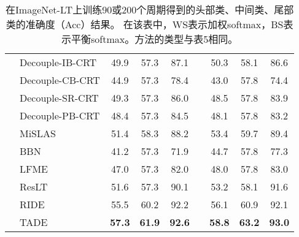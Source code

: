 \begin{table*}[!t]
\begin{minipage}[t]{0.48\textwidth}
{\begin{tabular}{llccccccc}
\cmidrule{2-9}          & Decouple-IB-CRT \cite{kang2019decoupling}  & 49.9  & 57.3  & 87.1  &       & 50.3  & 58.1  & 86.6  \\
& Decouple-CB-CRT \cite{kang2019decoupling} & 44.9  & 57.3  & 78.4  &       & 43.0  & 57.8  & 74.4  \\
& Decouple-SR-CRT \cite{kang2019decoupling}  & 49.3  & 57.3  & 86.0  &       & 48.5  & 57.8  & 83.9  \\
& Decouple-PB-CRT \cite{kang2019decoupling}  & 48.4  & 57.3  & 84.5  &       & 48.1  & 57.8  & 83.2  \\
& MiSLAS \cite{Zhong_2021}  & 51.4  & 58.3  & 88.2  &       & 53.4  & 59.7  & 89.4  \\
\cmidrule{2-9}          & BBN \cite{Zhou_2020}  & 41.2  & 57.3  & 71.9  &       & 44.7  & 57.8  & 77.3  \\
& LFME \cite{Xiang_2020}  & 47.0  & 57.3  & 82.0  &       & 48.0  & 57.8  & 83.0  \\
& ResLT \cite{Cui_2022}  & 51.6  & 57.3  & 90.1  &       & 53.2  & 58.1  & 91.6  \\
& RIDE \cite{wang2020long}  & 55.5  & 60.2  & 92.2  &       & 56.1  & 60.9  & 92.1  \\
& TADE \cite{zhang2021test} & \textbf{57.3} & \textbf{61.9} & \textbf{92.6} &       & \textbf{58.8} & \textbf{63.2} & \textbf{93.0} \\
\bottomrule
\end{tabular}}%
\label{tab:5}%
\end{minipage}
\begin{minipage}[t]{0.48\textwidth}
\makeatletter{}
\footnotesize
\centering
\captionsetup{font=footnotesize}
\caption{在ImageNet-LT上训练90或200个周期得到的头部类、中间类、尾部类的准确度（Acc）结果。
在该表中，WS表示加权softmax，BS表示平衡softmax。方法的类型与表5相同。}
\end{minipage}
\end{table*}
